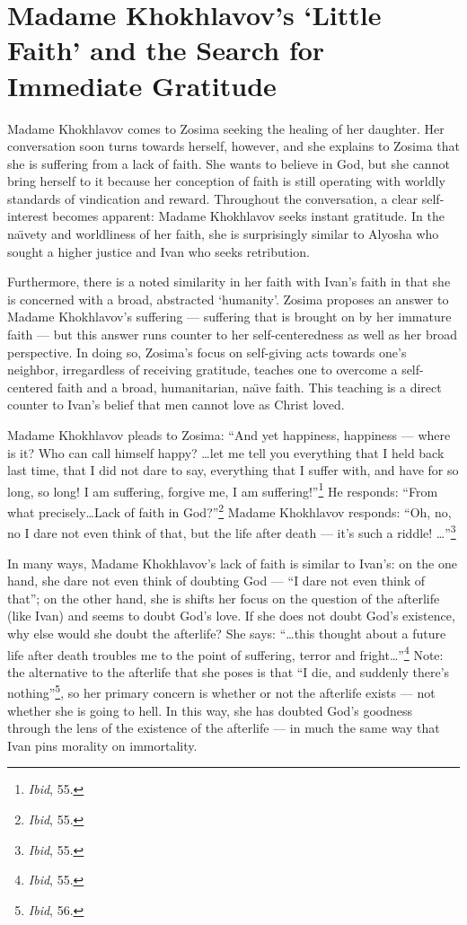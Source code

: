 \section{Madame Khokhlavov's `Little Faith' and the Search for Immediate Gratitude}
Madame Khokhlavov comes to Zosima seeking the healing of her daughter. Her conversation soon turns towards herself, however, and she explains to Zosima that she is suffering from a lack of faith. She wants to believe in God, but she cannot bring herself to it because her conception of faith is still operating with worldly standards of vindication and reward. Throughout the conversation, a clear self-interest becomes apparent: Madame Khokhlavov seeks instant gratitude. In the na\"{\i}vety and worldliness of her faith, she is surprisingly similar to Alyosha who sought a higher justice and Ivan who seeks retribution. 

Furthermore, there is a noted similarity in her faith with Ivan's faith in that she is concerned with a broad, abstracted `humanity'. Zosima proposes an answer to Madame Khokhlavov's suffering --- suffering that is brought on by her immature faith --- but this answer runs counter to her self-centeredness as well as her broad perspective. In doing so, Zosima's focus on self-giving acts towards one's neighbor, irregardless of receiving gratitude, teaches one to overcome a self-centered faith and a broad, humanitarian, na\"{\i}ve faith. This teaching is a direct counter to Ivan's belief that men cannot love as Christ loved.  

Madame Khokhlavov pleads to Zosima: ``And yet happiness, happiness --- where is it? Who can call himself happy? \ldots let me tell you everything that I held back last time, that I did not dare to say, everything that I suffer with, and have for so long, so long! I am suffering, forgive me, I am suffering!''\footnote{\emph{Ibid}, 55.} He responds: ``From what precisely\ldots Lack of faith in God?''\footnote{\emph{Ibid}, 55.} Madame Khokhlavov responds: ``Oh, no, no I dare not even think of that, but the life after death --- it's such a riddle! \ldots''\footnote{\emph{Ibid}, 55.} 

In many ways, Madame Khokhlavov's lack of faith is similar to Ivan's: on the one hand, she dare not even think of doubting God --- ``I dare not even think of that''; on the other hand, she is shifts her focus on the question of the afterlife (like Ivan) and seems to doubt God's love. If she does not doubt God's existence, why else would she doubt the afterlife? She says: ``\ldots this thought about a future life after death troubles me to the point of suffering, terror and fright\ldots''\footnote{\emph{Ibid}, 55.} Note: the alternative to the afterlife that she poses is that ``I die, and suddenly there's nothing''\footnote{\emph{Ibid}, 56.}, so her primary concern is whether or not the afterlife exists --- not whether she is going to hell. In this way, she has doubted God's goodness through the lens of the existence of the afterlife --- in much the same way that Ivan pins morality on immortality.

